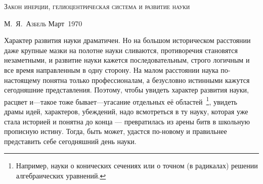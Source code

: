 \documentclass[twocolumn,10pt]{article}
\begin{document}
\begin{titlepage}
 \begin{center}

  \textsc{\LARGE{Закон инерции, гелиоцентрическая система и развитие науки}}

  \textsc{\large{М.~Я.~Азбель}}
  \vfill{\large Март~1970}

 \end{center}
\end{titlepage}
\author{М.~Я.~Азбель}
\date{Март~1970}
Характер развития науки драматичен. Но на большом историческом расстоянии даже крупные мазки на полотне науки сливаются, противоречия становятся незаметными, и развитие науки кажется последовательным, строго логичным и все время направленным в одну сторону. На малом расстоянии наука по-настоящему понятна только профессионалам, а безусловно истинными кажутся сегодняшние представления. Поэтому, чтобы увидеть характер развития науки, расцвет и---такое тоже бывает---угасание отдельных её областей~\footnote{Например, науки о конических сечениях или о точном (в радикалах) решении алгебраических уравнений.}, увидеть драмы идей, характеров, убеждений, надо всмотреться в ту науку, которая уже стала историей и понятна до конца --- превратилась из арены битв в школьную прописную истину. Тогда, быть может, удастся по-новому и правильнее представить себе сегодняшний день науки.
\end{document}
